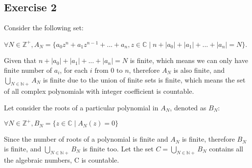 \subsection*{Exercise 2}
Consider the following set:

$\forall{N} \in \mathbb{Z^+}, A_N = \{a_0z^n + a_1z^{n-1} + ... + a_n, z \in \mathbb{C}\mid n + |a_0| + |a_1| + ... + |a_n| = N\}$.

Given that $n + |a_0| + |a_1| + ... + |a_n| = N$ is finite, which means we can only have finite number of $a_i$, for each $\text{$i$ from 0 to $n$} $, 
therefore $A_N$ is also finite, 
and $\bigcup_{N \in \mathbb{N+}} A_N$ is finite due to the union of finite sets is finite, which means the set of all complex polynomials with integer coefficient is countable.

Let consider the roots of a particular polynomial in $A_N$, denoted as $B_N$:

$\forall{N} \in \mathbb{Z^+}, B_N = \{z \in \mathbb{C}\mid A_N(z) = 0\}$

Since the number of roots of a polynomial is finite and $A_N$ is finite, therefore $B_N$ is finite, and $\bigcup_{N \in \mathbb{N+}} B_N$ is finite too. Let the set $C = \bigcup_{N \in \mathbb{N+}} B_N$ contains all the algebraic numbers, C is countable.

